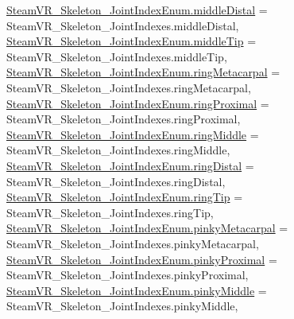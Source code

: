\begin{DoxyCompactItemize}
\mbox{\hyperlink{namespace_valve_1_1_v_r_a99f7cc968994699a7485078bafddac17a5dd6e376551487780f70bab2d9dc1c1a}{Steam\+V\+R\+\_\+\+Skeleton\+\_\+\+Joint\+Index\+Enum.\+middle\+Distal}} = Steam\+V\+R\+\_\+\+Skeleton\+\_\+\+Joint\+Indexes.\+middle\+Distal, 
\newline
\mbox{\hyperlink{namespace_valve_1_1_v_r_a99f7cc968994699a7485078bafddac17a0b2a94880242b37507c64105cc1a94ef}{Steam\+V\+R\+\_\+\+Skeleton\+\_\+\+Joint\+Index\+Enum.\+middle\+Tip}} = Steam\+V\+R\+\_\+\+Skeleton\+\_\+\+Joint\+Indexes.\+middle\+Tip, 
\mbox{\hyperlink{namespace_valve_1_1_v_r_a99f7cc968994699a7485078bafddac17a6733b001f936590c1d314f4b8f968521}{Steam\+V\+R\+\_\+\+Skeleton\+\_\+\+Joint\+Index\+Enum.\+ring\+Metacarpal}} = Steam\+V\+R\+\_\+\+Skeleton\+\_\+\+Joint\+Indexes.\+ring\+Metacarpal, 
\mbox{\hyperlink{namespace_valve_1_1_v_r_a99f7cc968994699a7485078bafddac17a66a2fcd7782dfe99a083e3d14850f836}{Steam\+V\+R\+\_\+\+Skeleton\+\_\+\+Joint\+Index\+Enum.\+ring\+Proximal}} = Steam\+V\+R\+\_\+\+Skeleton\+\_\+\+Joint\+Indexes.\+ring\+Proximal, 
\mbox{\hyperlink{namespace_valve_1_1_v_r_a99f7cc968994699a7485078bafddac17a809cbf956841d08f913cf87009cfaaf4}{Steam\+V\+R\+\_\+\+Skeleton\+\_\+\+Joint\+Index\+Enum.\+ring\+Middle}} = Steam\+V\+R\+\_\+\+Skeleton\+\_\+\+Joint\+Indexes.\+ring\+Middle, 
\newline
\mbox{\hyperlink{namespace_valve_1_1_v_r_a99f7cc968994699a7485078bafddac17a86998a80aed4bdd356046dbca3255a5f}{Steam\+V\+R\+\_\+\+Skeleton\+\_\+\+Joint\+Index\+Enum.\+ring\+Distal}} = Steam\+V\+R\+\_\+\+Skeleton\+\_\+\+Joint\+Indexes.\+ring\+Distal, 
\mbox{\hyperlink{namespace_valve_1_1_v_r_a99f7cc968994699a7485078bafddac17af73e098a1c8ce2afc48bd2ca08ba5920}{Steam\+V\+R\+\_\+\+Skeleton\+\_\+\+Joint\+Index\+Enum.\+ring\+Tip}} = Steam\+V\+R\+\_\+\+Skeleton\+\_\+\+Joint\+Indexes.\+ring\+Tip, 
\mbox{\hyperlink{namespace_valve_1_1_v_r_a99f7cc968994699a7485078bafddac17a0b03701bc9220cc66b6ccfebdea4f3d2}{Steam\+V\+R\+\_\+\+Skeleton\+\_\+\+Joint\+Index\+Enum.\+pinky\+Metacarpal}} = Steam\+V\+R\+\_\+\+Skeleton\+\_\+\+Joint\+Indexes.\+pinky\+Metacarpal, 
\mbox{\hyperlink{namespace_valve_1_1_v_r_a99f7cc968994699a7485078bafddac17a4d0f277424911e0e7816a01a1ee2402b}{Steam\+V\+R\+\_\+\+Skeleton\+\_\+\+Joint\+Index\+Enum.\+pinky\+Proximal}} = Steam\+V\+R\+\_\+\+Skeleton\+\_\+\+Joint\+Indexes.\+pinky\+Proximal, 
\newline
\mbox{\hyperlink{namespace_valve_1_1_v_r_a99f7cc968994699a7485078bafddac17a0b0096f5bae939a016d26e5cd702872b}{Steam\+V\+R\+\_\+\+Skeleton\+\_\+\+Joint\+Index\+Enum.\+pinky\+Middle}} = Steam\+V\+R\+\_\+\+Skeleton\+\_\+\+Joint\+Indexes.\+pinky\+Middle, 

\end{DoxyCompactItemize}
